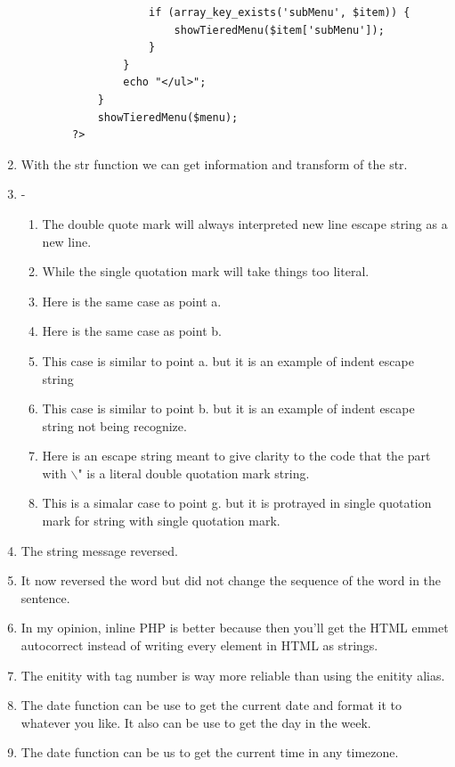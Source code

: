 \documentclass[12pt,titlepage]{article}
\begin{document}
\begin{enumerate}
\begin{verbatim}
                    if (array_key_exists('subMenu', $item)) {
                        showTieredMenu($item['subMenu']);
                    }
                }
                echo "</ul>";
            }
            showTieredMenu($menu);
        ?>
    \end{verbatim}
    \item With the str function we can get information and transform of the str.
    \item -
    \begin{enumerate}[label=\alph*.]
        \item The double quote mark will always interpreted new line escape string as a new line.
        \item While the single quotation mark will take things too literal.
        \item Here is the same case as point a.
        \item Here is the same case as point b.
        \item This case is similar to point a. but it is an example of indent escape string
        \item This case is similar to point b. but it is an example of indent escape string not being recognize.
        \item Here is an escape string meant to give clarity to the code that the part with $\backslash$" is a literal double quotation mark string.
        \item This is a simalar case to point g. but it is protrayed in single quotation mark for string with single quotation mark.
    \end{enumerate}
    \item The string message reversed.
    \item It now reversed the word but did not change the sequence of the word in the sentence.
    \item In my opinion, inline PHP is better because then you'll get the HTML emmet autocorrect instead of writing every element in HTML as strings.
    \item The enitity with tag number is way more reliable than using the enitity alias.
    \item The date function can be use to get the current date and format it to whatever you like. It also can be use to get the day in the week.
    \item The date function can be us to get the current time in any timezone.
\end{enumerate}
\end{document}
